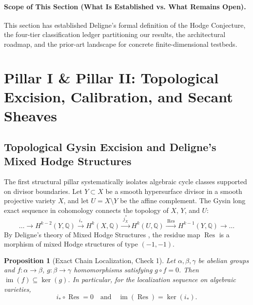 \documentclass[11pt,a4paper]{article}
\newtheorem{proposition}[theorem]{Proposition}
\theoremstyle{definition}
\theoremstyle{remark}
\DeclareMathOperator{\Res}{Res}
\begin{document}
\paragraph{Scope of This Section (What Is Established vs. What Remains Open).}
This section has established Deligne's formal definition of the Hodge Conjecture, the four-tier classification ledger partitioning our results, the architectural roadmap, and the prior-art landscape for concrete finite-dimensional testbeds.

\section{Pillar I \& Pillar II: Topological Excision, Calibration, and Secant Sheaves}
\label{sec:pillars_1_2}

\subsection{Topological Gysin Excision and Deligne's Mixed Hodge Structures}
The first structural pillar systematically isolates algebraic cycle classes supported on divisor boundaries. Let $Y \subset X$ be a smooth hypersurface divisor in a smooth projective variety $X$, and let $U = X \setminus Y$ be the affine complement. The Gysin long exact sequence in cohomology connects the topology of $X$, $Y$, and $U$:
\begin{equation}
\dots \longrightarrow H^{k-2}(Y, \mathbb{Q}) \xrightarrow{\;i_*\;} H^k(X, \mathbb{Q}) \xrightarrow{\;j^*_X\;} H^k(U, \mathbb{Q}) \xrightarrow{\;\Res\;} H^{k-1}(Y, \mathbb{Q}) \longrightarrow \dots
\end{equation}
By Deligne's theory of Mixed Hodge Structures \cite{Deligne1982}, the residue map $\Res$ is a morphism of mixed Hodge structures of type $(-1,-1)$. 

\begin{proposition}[Exact Chain Localization, Check 1]
Let $\alpha, \beta, \gamma$ be abelian groups and $f : \alpha \to \beta$, $g : \beta \to \gamma$ homomorphisms satisfying $g \circ f = 0$. Then $\operatorname{im}(f) \subseteq \ker(g)$. In particular, for the localization sequence on algebraic varieties,
\begin{equation}
i_* \circ \Res = 0 \quad \text{and} \quad \operatorname{im}(\Res) = \ker(i_*).
\end{equation}
\end{proposition}
\end{document}
